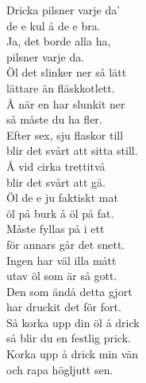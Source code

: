 \documentclass[a6paper, 10pt, twoside]{article}
\begin{document}
\begin{center}
\end{center}
\begin{lyrics}
Dricka pilsner varje da'\\
de e kul å de e bra.\\
Ja, det borde alla ha,\\
pilsner varje da.
\vspace{5pt}\\
Öl det slinker ner så lätt\\
lättare än fläskkotlett.\\
Å när en har slunkit ner\\
så måste du ha fler.
\vspace{5pt}\\
Efter sex, sju flaskor till\\
blir det svårt att sitta still.\\
Å vid cirka trettitvå\\
blir det svårt att gå.
\vspace{5pt}\\
Öl de e ju faktiskt mat\\
öl på burk å öl på fat.\\
Måste fyllas på i ett\\
för annars går det snett.
\vspace{5pt}\\
Ingen har väl illa mått\\
utav öl som är så gott.\\
Den som ändå detta gjort\\
har druckit det för fort.
\vspace{5pt}\\
Så korka upp din öl å drick\\
så blir du en festlig prick.\\
Korka upp å drick min vän\\
och rapa högljutt sen.
\end{lyrics}
\end{document}
